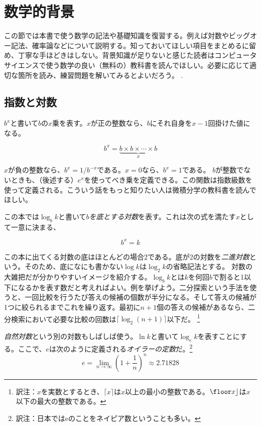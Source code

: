 \section{数学的背景}
この節では本書で使う数学の記法や基礎知識を復習する。例えば対数やビッグオー記法、確率論などについて説明する。知っておいてほしい項目をまとめるに留め、丁寧な手ほどきはしない。背景知識が足りないと感じた読者はコンピュータサイエンスで使う数学の良い（無料の）教科書を読んでほしい。必要に応じて適切な箇所を読み、練習問題を解いてみるとよいだろう。
\cite{llm11}.

\subsection{指数と対数}

$b^x$と書いて$b$の$x$乗を表す。$x$が正の整数なら、$b$にそれ自身を$x-1$回掛けた値になる。

\[
    b^x = \underbrace{b\times b\times \cdots \times b}_{x}
\]

$ x $が負の整数なら、$b^x=1/b^{-x}$である。$x=0$なら、$b^x=1$である。
$b$が整数でないときも、（後述する）$e^x$を使ってべき乗を定義できる。この関数は指数級数を使って定義される。こういう話をもっと知りたい人は微積分学の教科書を読んでほしい。

この本では$\log_b k$と書いて\emph{$b$を底とする対数}を表す。これは次の式を満たす$x$として一意に決まる、

\[
    b^{x} = k
\]

この本に出てくる対数の底はほとんどの場合2である。底が2の対数を\emph{二進対数}という。そのため、底になにも書かない$\log k$は$\log_2 k$の省略記法とする。
%
%
対数の大雑把だが分かりやすいイメージを紹介する。$\log_b k$とは$k$を何回$b$で割ると1以下になるかを表す数だと考えればよい。例を挙げよう。二分探索という手法を使うと、一回比較を行うたび答えの候補の個数が半分になる。そして答えの候補が1つに絞られるまでこれを繰り返す。最初に$n+1$個の答えの候補があるなら、二分検索において必要な比較の回数は$\lceil \log_2(n+1) \rceil$以下だ。
\footnote{訳注：$x$を実数とするとき、$\lceil x \rceil$は$x$以上の最小の整数である。$\floor x \rfloor$は$x$以下の最大の整数である。}

%
%
\emph{自然対数}という別の対数もしばしば使う。$\ln k$と書いて$\log_e k$を表すことにする。ここで、$e$は次のように定義される\emph{オイラーの定数}だ。\footnote{訳注：日本ではeのことをネイピア数ということも多い。}
%
%
\[
   e = \lim_{n\rightarrow\infty} \left(1+\frac{1}{n}\right)^n
   \approx  2.71828
\]

